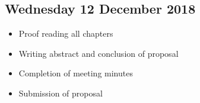 \subsection*{Wednesday 12 December 2018}
\begin{itemize}
	\item Proof reading all chapters
	\item Writing abstract and conclusion of proposal
	\item Completion of meeting minutes
	\item Submission of proposal
\end{itemize}
